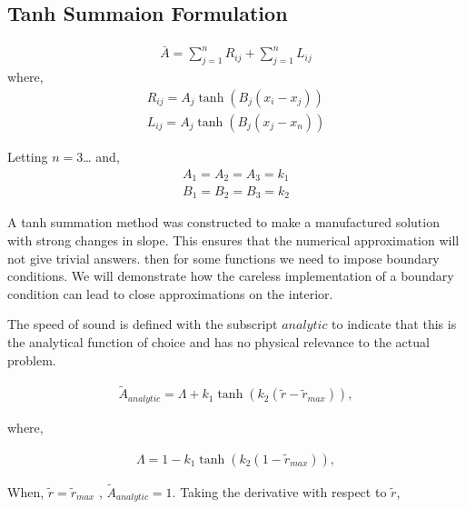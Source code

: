 \subsection{Tanh Summaion Formulation}
\begin{align*}
    \bar{A} = \sum_{j=1}^n R_{ij} + \sum_{j=1}^n L_{ij} 
\end{align*}
where,
\begin{align*}
    R_{ij} = A_j \tanh(B_j (x_i - x_j)) \\ 
    L_{ij} = A_j \tanh(B_j (x_j - x_n))  
\end{align*}

Letting $n = 3$\ldots
%
and,
\begin{align*}
    A_1 = A_2 = A_3 = k_1 \\ 
    B_1 = B_2 = B_3 = k_2  
\end{align*}

A tanh summation method was constructed to make a manufactured solution with 
strong changes in slope. This ensures that the numerical approximation will not 
give trivial answers. 
then for some functions we need to impose boundary conditions. We will demonstrate
how the careless implementation of a boundary condition can lead to close approximations
on the interior.


The speed of sound is defined with the subscript $analytic$ to indicate 
that this is the analytical function of choice and has no physical relevance 
to the actual problem.

\begin{align*}
\widetilde{A}_{analytic} = \Lambda + k_1 \tanh \left( k_2 \left( \widetilde{r} - \widetilde{r}_{max} \right) \right),
\end{align*}

where, 

\begin{align*}
    \Lambda = 1 - k_1 \tanh(k_2 (1 - \widetilde{r}_{max})),
\end{align*}

When, $\widetilde{r}=\widetilde{r}_{max}$ , $\widetilde{A}_{analytic} = 1$.  
Taking the derivative with respect to $\widetilde{r}$,

